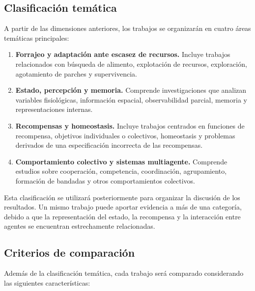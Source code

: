 \documentclass[conference]{IEEEtran}
\begin{document}
\subsection{Clasificación temática}

A partir de las dimensiones anteriores, los trabajos se organizarán en
cuatro áreas temáticas principales:

\begin{enumerate}

    \item \textbf{Forrajeo y adaptación ante escasez de recursos.}
    Incluye trabajos relacionados con búsqueda de alimento, explotación
    de recursos, exploración, agotamiento de parches y supervivencia.

    \item \textbf{Estado, percepción y memoria.}
    Comprende investigaciones que analizan variables fisiológicas,
    información espacial, observabilidad parcial, memoria y
    representaciones internas.

    \item \textbf{Recompensas y homeostasis.}
    Incluye trabajos centrados en funciones de recompensa, objetivos
    individuales o colectivos, homeostasis y problemas derivados de una
    especificación incorrecta de las recompensas.

    \item \textbf{Comportamiento colectivo y sistemas multiagente.}
    Comprende estudios sobre cooperación, competencia, coordinación,
    agrupamiento, formación de bandadas y otros comportamientos
    colectivos.

\end{enumerate}

Esta clasificación se utilizará posteriormente para organizar la
discusión de los resultados. Un mismo trabajo puede aportar evidencia a
más de una categoría, debido a que la representación del estado, la
recompensa y la interacción entre agentes se encuentran estrechamente
relacionadas.

\subsection{Criterios de comparación}

Además de la clasificación temática, cada trabajo será comparado
considerando las siguientes características:
\end{document}

